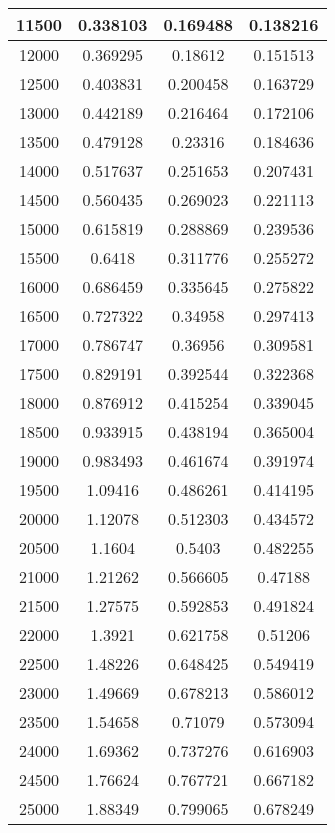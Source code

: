 \documentclass{article}
\begin{document}
\begin{longtable}{|c|c|c|c|}
			11500  &  0.338103	 &  0.169488	 &  0.138216  \\ \hline
			12000  &  0.369295	 &  0.18612	     &  0.151513  \\ \hline
			12500  &  0.403831	 &  0.200458	 &  0.163729  \\ \hline
			13000  &  0.442189	 &  0.216464	 &  0.172106  \\ \hline
			13500  &  0.479128	 &  0.23316	     &  0.184636  \\ \hline
			14000  &  0.517637	 &  0.251653	 &  0.207431  \\ \hline
			14500  &  0.560435	 &  0.269023	 &  0.221113  \\ \hline
			15000  &  0.615819	 &  0.288869	 &  0.239536  \\ \hline
			15500  &  0.6418	 &  0.311776	 &  0.255272  \\ \hline
			16000  &  0.686459	 &  0.335645	 &  0.275822  \\ \hline
			16500  &  0.727322	 &  0.34958	     &  0.297413  \\ \hline
			17000  &  0.786747	 &  0.36956	     &  0.309581  \\ \hline
			17500  &  0.829191	 &  0.392544	 &  0.322368  \\ \hline
			18000  &  0.876912	 &  0.415254	 &  0.339045  \\ \hline
			18500  &  0.933915	 &  0.438194	 &  0.365004  \\ \hline
			19000  &  0.983493	 &  0.461674	 &  0.391974  \\ \hline
			19500  &  1.09416	 &  0.486261	 &  0.414195  \\ \hline
			20000  &  1.12078	 &  0.512303	 &  0.434572  \\ \hline
			20500  &  1.1604	 &  0.5403	     &  0.482255  \\ \hline
			21000  &  1.21262	 &  0.566605	 &  0.47188  \\ \hline
			21500  &  1.27575	 &  0.592853	 &  0.491824  \\ \hline
			22000  &  1.3921	 &  0.621758	 &  0.51206  \\ \hline
			22500  &  1.48226	 &  0.648425	 &  0.549419  \\ \hline
			23000  &  1.49669	 &  0.678213	 &  0.586012  \\ \hline
			23500  &  1.54658	 &  0.71079      &	0.573094  \\ \hline
			24000  &  1.69362	 &  0.737276	 &  0.616903  \\ \hline
			24500  &  1.76624	 &  0.767721	 &  0.667182  \\ \hline
			25000  &  1.88349	 &  0.799065	 &  0.678249     \\ \hline
		\end{longtable}
\end{document}
